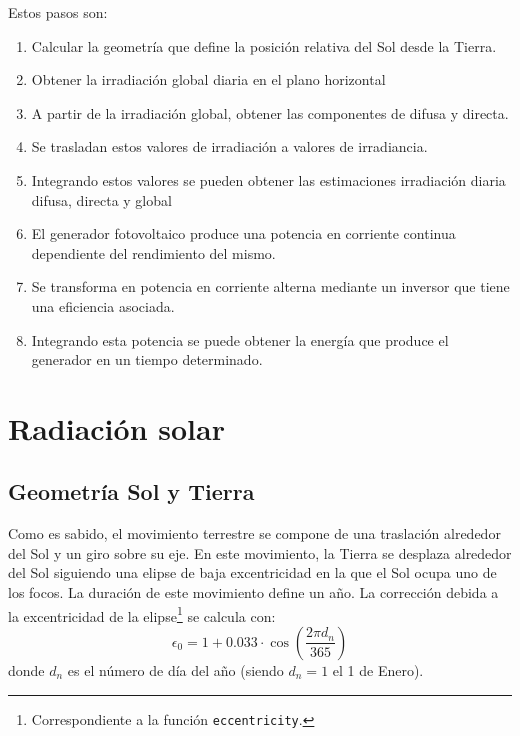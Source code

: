 Estos pasos son:
\begin{enumerate}
\item Calcular la geometría que define la posición relativa del Sol desde la Tierra.
\item Obtener la irradiación global diaria en el plano horizontal
\item A partir de la irradiación global, obtener las componentes de difusa y directa.
\item Se trasladan estos valores de irradiación a valores de irradiancia.
\item Integrando estos valores se pueden obtener las estimaciones irradiación diaria difusa, directa y global
\item El generador fotovoltaico produce una potencia en corriente continua dependiente del rendimiento del mismo.
\item Se transforma en potencia en corriente alterna mediante un inversor que tiene una eficiencia asociada.
\item Integrando esta potencia se puede obtener la energía que produce el generador en un tiempo determinado.
\end{enumerate}


\section{Radiación solar}
\label{sec:org510454c}
\label{radiacion-solar}
\subsection{Geometría Sol y Tierra}
\label{sec:org447d21f}
Como es sabido, el movimiento terrestre se compone de una traslación alrededor del Sol y un giro sobre su eje. En este movimiento, la Tierra se desplaza alrededor del Sol siguiendo una elipse de baja excentricidad en la que el Sol ocupa uno de los focos. La duración de este movimiento define un año. La corrección debida a la excentricidad de la elipse\footnote{Correspondiente a la función \texttt{eccentricity}.} se calcula con: 
\begin{equation}
\epsilon_0=1+0.033\cdot \cos(\frac{2\pi d_n}{365})
\end{equation}
donde \(d_n\) es el número de día del año (siendo \(d_n=1\) el 1 de Enero). 

